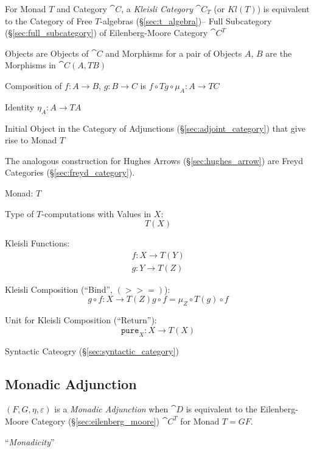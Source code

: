 For Monad $T$ and Category $\cat{C}$, a \emph{Kleisli Category}
$\cat{C}_T$ (or $Kl(T)$) is equivalent to the Category of Free
$T$-algebras (\S\ref{sec:t_algebra})-- Full Subcategory
(\S\ref{sec:full_subcategory}) of Eilenberg-Moore Category
$\cat{C}^T$

Objects are Objects of $\cat{C}$ and Morphisms for a pair of
Objects $A$, $B$ are the Morphisms in $\cat{C}(A, T B)$

Composition of $f : A \rightarrow B$, $g : B \rightarrow C$ is $f
\circ T g \circ \mu_A : A \rightarrow TC$

Identity $\eta_A : A \rightarrow T A$

Initial Object in the Category of Adjunctions
(\S\ref{sec:adjoint_category}) that give rise to Monad $T$

The analogous construction for Hughes Arrows
(\S\ref{sec:hughes_arrow}) are Freyd Categories
(\S\ref{sec:freyd_category}).

Monad: $T$

Type of $T$-computations with Values in $X$:
\[
  T (X)
\]

Kleisli Functions:
\[
\begin{split}
  f : X \rightarrow T(Y) \\
  g : Y \rightarrow T(Z)
\end{split}
\]

Kleisli Composition (``Bind'', $\mathtt{(>>=)}$):
\[
  g \circ f : X \rightarrow T(Z)
  g \circ f = \mu_Z \circ T(g) \circ f
\]

Unit for Kleisli Composition (``Return''):
\[
  \mathtt{pure}_X : X \rightarrow T (X)
\]

Syntactic Cateogry (\S\ref{sec:syntactic_category})



\subsection{Monadic Adjunction}\label{sec:monadic_adjunction}

$(F,G,\eta,\varepsilon)$ is a \emph{Monadic Adjunction} when
$\cat{D}$ is equivalent to the Eilenberg-Moore Category
(\S\ref{sec:eilenberg_moore}) $\cat{C}^T$ for Monad $T = GF$.

``\emph{Monadicity}''



